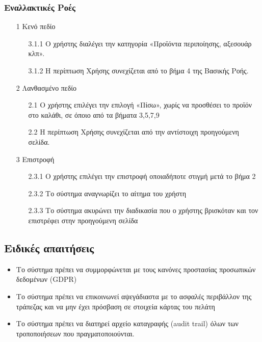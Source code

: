 \documentclass[12pt,a4paper,twoside]{book}
\begin{document}
\subsubsection{Εναλλακτικές Ροές}
\begin{enumerate}
  \item[1 ] Κενό πεδίο  %
        \begin{enumerate}
          \item[3.1.1 ] Ο χρήστης διαλέγει την κατηγορία «Προϊόντα περιποίησης, αξεσουάρ κλπ». %
          \item[3.1.2 ] Η περίπτωση Χρήσης συνεχίζεται από το βήμα 4 της Βασικής Ροής. %
        \end{enumerate}
  \item[2 ] Λανθασμένο πεδίο %
        \begin{enumerate}
          \item[2.1 ] Ο χρήστης επιλέγει την επιλογή «Πίσω», χωρίς να προσθέσει το προϊόν στο καλάθι, σε όποιο από τα βήματα 3,5,7,9 %
          \item[2.2 ] Η περίπτωση Χρήσης συνεχίζεται από την αντίστοιχη προηγούμενη σελίδα. %
        \end{enumerate}
  \item[3 ] Επιστροφή
        \begin{enumerate}
          \item[2.3.1 ] Ο χρήστης επιλέγει την επιστροφή οποιαδήποτε στιγμή μετά το βήμα 2 %
          \item[2.3.2 ] Το σύστημα αναγνωρίζει το αίτημα του χρήστη %
          \item[2.3.3 ] Το σύστημα ακυρώνει την διαδικασία που ο χρήστης βρισκόταν και τον επιστρέφει στην προηγούμενη σελίδα %
        \end{enumerate}
\end{enumerate}

\subsection{Ειδικές απαιτήσεις} %
\begin{itemize}
  \item Το σύστημα πρέπει να συμμορφώνεται με τους κανόνες προστασίας προσωπικών δεδομένων (GDPR)  %
  \item Το σύστημα πρέπει να επικοινωνεί αψεγάδιαστα με το ασφαλές περιβάλλον της τράπεζας και να μην έχει πρόσβαση σε στοιχεία κάρτας του πελάτη   %
  \item Το σύστημα πρέπει να διατηρεί αρχείο καταγραφής (audit trail) όλων των τροποποιήσεων που πραγματοποιούνται. %
\end{itemize}
\end{document}
